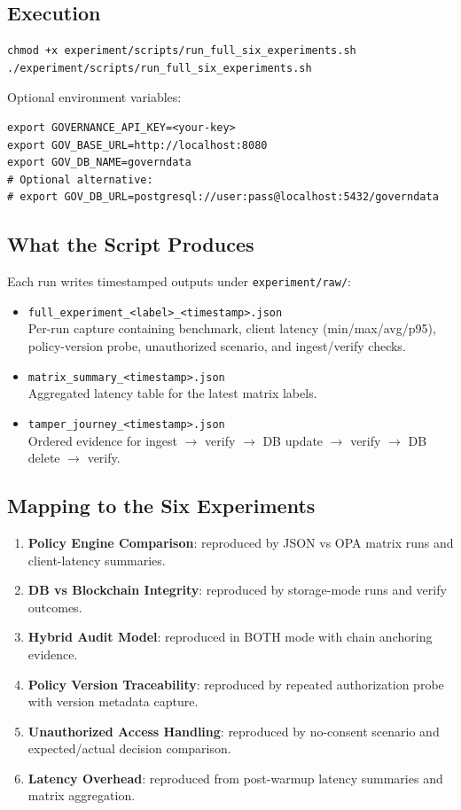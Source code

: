 \subsection{Execution}

\begin{verbatim}
chmod +x experiment/scripts/run_full_six_experiments.sh
./experiment/scripts/run_full_six_experiments.sh
\end{verbatim}

Optional environment variables:
\begin{verbatim}
export GOVERNANCE_API_KEY=<your-key>
export GOV_BASE_URL=http://localhost:8080
export GOV_DB_NAME=governdata
# Optional alternative:
# export GOV_DB_URL=postgresql://user:pass@localhost:5432/governdata
\end{verbatim}

\subsection{What the Script Produces}

Each run writes timestamped outputs under \texttt{experiment/raw/}:
\begin{itemize}
  \item \texttt{full\_experiment\_<label>\_<timestamp>.json} \\
  Per-run capture containing benchmark, client latency (min/max/avg/p95), policy-version probe, unauthorized scenario, and ingest/verify checks.
  \item \texttt{matrix\_summary\_<timestamp>.json} \\
  Aggregated latency table for the latest matrix labels.
  \item \texttt{tamper\_journey\_<timestamp>.json} \\
  Ordered evidence for ingest $\rightarrow$ verify $\rightarrow$ DB update $\rightarrow$ verify $\rightarrow$ DB delete $\rightarrow$ verify.
\end{itemize}

\subsection{Mapping to the Six Experiments}

\begin{enumerate}
  \item \textbf{Policy Engine Comparison}: reproduced by JSON vs OPA matrix runs and client-latency summaries.
  \item \textbf{DB vs Blockchain Integrity}: reproduced by storage-mode runs and verify outcomes.
  \item \textbf{Hybrid Audit Model}: reproduced in BOTH mode with chain anchoring evidence.
  \item \textbf{Policy Version Traceability}: reproduced by repeated authorization probe with version metadata capture.
  \item \textbf{Unauthorized Access Handling}: reproduced by no-consent scenario and expected/actual decision comparison.
  \item \textbf{Latency Overhead}: reproduced from post-warmup latency summaries and matrix aggregation.
\end{enumerate}

